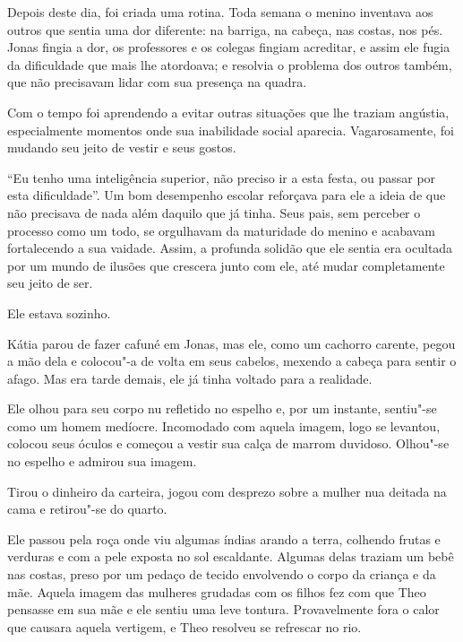 Depois deste dia, foi criada uma rotina. Toda semana o menino inventava
aos outros que sentia uma dor diferente: na barriga, na cabeça, nas
costas, nos pés. Jonas fingia a dor, os professores e os colegas fingiam
acreditar, e assim ele fugia da dificuldade que mais lhe atordoava; e
resolvia o problema dos outros também, que não precisavam lidar com sua
presença na quadra.

Com o tempo foi aprendendo a evitar outras situações que lhe traziam
angústia, especialmente momentos onde sua inabilidade social aparecia.
Vagarosamente, foi mudando seu jeito de vestir e seus gostos.

``Eu tenho uma inteligência superior, não preciso ir a esta festa, ou
passar por esta dificuldade''. Um bom desempenho escolar reforçava para
ele a ideia de que não precisava de nada além daquilo que já tinha. Seus
pais, sem perceber o processo como um todo, se orgulhavam da maturidade
do menino e acabavam fortalecendo a sua vaidade. Assim, a profunda
solidão que ele sentia era ocultada por um mundo de ilusões que crescera
junto com ele, até mudar completamente seu jeito de ser.

Ele estava sozinho.

\asterisc

Kátia parou de fazer cafuné em Jonas, mas ele, como um cachorro carente,
pegou a mão dela e colocou"-a de volta em seus cabelos, mexendo a cabeça
para sentir o afago. Mas era tarde demais, ele já tinha voltado para a
realidade.

Ele olhou para seu corpo nu refletido no espelho e, por um instante,
sentiu"-se como um homem medíocre. Incomodado com aquela imagem, logo se
levantou, colocou seus óculos e começou a vestir sua calça de marrom
duvidoso. Olhou"-se no espelho e admirou sua imagem.

Tirou o dinheiro da carteira, jogou com desprezo sobre a mulher nua
deitada na cama e retirou"-se do quarto.

\asterisc


Ele passou pela roça onde viu algumas índias arando a terra, colhendo
frutas e verduras e com a pele exposta no sol escaldante. Algumas delas
traziam um bebê nas costas, preso por um pedaço de tecido envolvendo o
corpo da criança e da mãe. Aquela imagem das mulheres grudadas com os
filhos fez com que Theo pensasse em sua mãe e ele sentiu uma leve
tontura. Provavelmente fora o calor que causara aquela vertigem, e
Theo resolveu se refrescar no rio.


